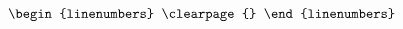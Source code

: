 \documentclass[10pt]{article}
\begin{document}
\[\begin{linenumbers}
%
%

\clearpage{}

\end{linenumbers}\]
\end{document}
